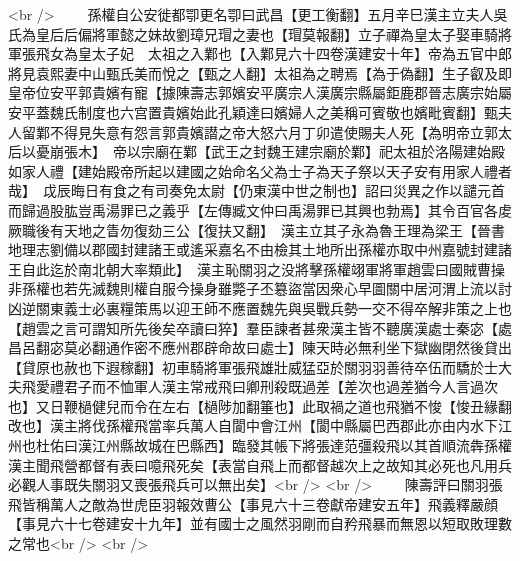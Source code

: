 <br />
　　孫權自公安徙都卾更名卾曰武昌【更工衡翻】五月辛巳漢主立夫人吳氏為皇后后偏將軍懿之妹故劉璋兄瑁之妻也【瑁莫報翻】立子禪為皇太子娶車騎將軍張飛女為皇太子妃　太祖之入鄴也【入鄴見六十四卷漢建安十年】帝為五官中郎將見袁熙妻中山甄氏美而悅之【甄之人翻】太祖為之聘焉【為于偽翻】生子叡及即皇帝位安平郭貴嬪有寵【據陳壽志郭嬪安平廣宗人漢廣宗縣屬鉅鹿郡晉志廣宗始屬安平蓋魏氏制度也六宫置貴嬪始此孔穎達曰嬪婦人之美稱可賓敬也嬪毗賓翻】甄夫人留鄴不得見失意有怨言郭貴嬪譛之帝大怒六月丁卯遣使賜夫人死【為明帝立郭太后以憂崩張木】　帝以宗廟在鄴【武王之封魏王建宗廟於鄴】祀太祖於洛陽建始殿如家人禮【建始殿帝所起以建國之始命名父為士子為天子祭以天子安有用家人禮者哉】　戉辰晦日有食之有司奏免太尉【仍東漢中世之制也】詔曰災異之作以譴元首而歸過股肱豈禹湯罪已之義乎【左傳臧文仲曰禹湯罪已其興也勃焉】其令百官各䖍厥職後有天地之眚勿復劾三公【復扶又翻】　漢主立其子永為魯王理為梁王【晉書地理志劉備以郡國封建諸王或遙采嘉名不由檢其土地所出孫權亦取中州嘉號封建諸王自此迄於南北朝大率類此】　漢主恥關羽之没將擊孫權翊軍將軍趙雲曰國賊曹操非孫權也若先滅魏則權自服今操身雖斃子丕簒盜當因衆心早圖關中居河渭上流以討凶逆關東義士必裏糧策馬以迎王師不應置魏先與吳戰兵勢一交不得卒解非策之上也【趙雲之言可謂知所先後矣卒讀曰猝】羣臣諫者甚衆漢主皆不聽廣漢處士秦宓【處昌呂翻宓莫必翻通作密不應州郡辟命故曰處士】陳天時必無利坐下獄幽閉然後貸出【貸原也赦也下遐稼翻】初車騎將軍張飛雄壯威猛亞於關羽羽善待卒伍而驕於士大夫飛愛禮君子而不恤軍人漢主常戒飛曰卿刑殺既過差【差次也過差猶今人言過次也】又日鞭檛健兒而令在左右【檛陟加翻箠也】此取禍之道也飛猶不悛【悛丑緣翻改也】漢主將伐孫權飛當率兵萬人自閬中會江州【閬中縣屬巴西郡此亦由内水下江州也杜佑曰漢江州縣故城在巴縣西】臨發其帳下將張達范彊殺飛以其首順流犇孫權漢主聞飛營都督有表曰噫飛死矣【表當自飛上而都督越次上之故知其必死也凡用兵必觀人事既失關羽又喪張飛兵可以無出矣】<br />
<br />
　　陳壽評曰關羽張飛皆稱萬人之敵為世虎臣羽報效曹公【事見六十三卷獻帝建安五年】飛義釋嚴顔【事見六十七卷建安十九年】並有國士之風然羽剛而自矜飛暴而無恩以短取敗理數之常也<br />
<br />
